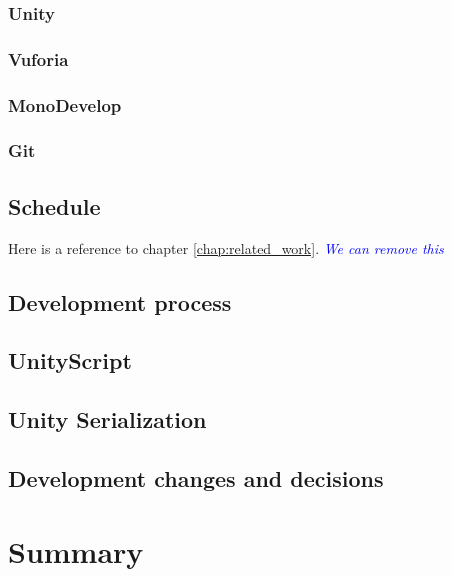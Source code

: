 \documentclass[BSP,english,oneside]{classes/gucthesis}
\newcommand{\comment}[1]{\textcolor{blue}{\emph{#1}}}
\begin{document}
		\section{Unity}
			

		\section{Vuforia}
			

		\section{MonoDevelop}
			

		\section{Git}
			

	\chapter{Schedule}
		
		Here is a reference to chapter \ref{chap:related_work}. \comment{We can remove this}

	\chapter{Development process}
		

	\chapter{UnityScript}
		\label{chap:UnityScript}
		

	\chapter{Unity Serialization}
		\label{chap:UnitySerialization}
		

	\chapter{Development changes and decisions}
		\label{chap:Developmentchangesanddecisions}
		


\part{Summary}
\end{document}
